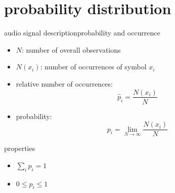 \section{probability distribution}
\begin{frame}{audio signal description}{probability and occurrence}
	\begin{itemize}
		\item[]	$N$: number of overall observations
		\item[] $N(x_i)$: number of occurrences of symbol $x_i$
	\end{itemize}
	
	\pause
	\begin{itemize}
		\item	relative number of occurrences:
				\begin{equation*}
					\hat{p}_i = \frac{N(x_i)}{N}
				\end{equation*}
		
		\pause
		\item	probability:
				\begin{equation*}
					p_i = \lim\limits_{N\rightarrow\infty} \frac{N(x_i)}{N}
				\end{equation*}
	\end{itemize}
    \pause
    \begin{block}{properties}
        \begin{itemize}
            \item[]   $\sum\limits_i p_i = 1$
            \item[]   $0 \leq p_i \leq 1$
        \end{itemize}
    \end{block}
\end{frame}

